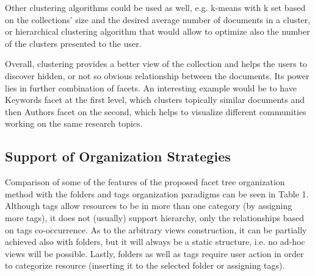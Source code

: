 \documentclass[12pt]{article}
\begin{document}
    Other clustering algorithms could be used as well, e.g. k-means with k set based on the collections’ size and the desired average number of documents in a cluster, or hierarchical clustering algorithm that would allow to optimize also the number of the clusters presented to the user.
  
   Overall, clustering provides a better view of the collection and helps the users to discover hidden, or not so obvious relationship between the documents. Its power lies in further combination of facets. An interesting example would be to have Keywords facet at the first level, which clusters topically similar documents and then Authors facet on the second, which helps to visualize different communities working on the same research topics.
   
    \subsection{Support of Organization Strategies}
   
        Comparison of some of the features of the proposed facet tree organization method with the folders and tags organization paradigms can be seen in Table 1. Although tags allow resources to be in more than one category (by assigning more tags), it does not (usually) support hierarchy, only the relationships based on tags co-occurrence. As to the arbitrary views construction, it can be partially achieved also with folders, but it will always be a static structure, i.e. no ad-hoc views will be possible. Lastly, folders as well as tags require user action in order to categorize resource (inserting it to the selected folder or assigning tags).
   
\end{document}
